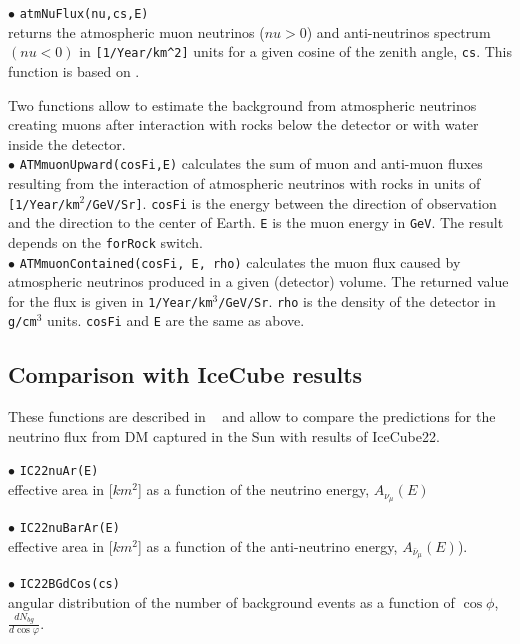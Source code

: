 \documentclass[12pt,a4paper]{article}
\begin{document}
\noindent $\bullet$ \verb|atmNuFlux(nu,cs,E)|\\
returns the atmospheric  muon neutrinos ($nu>0$) and anti-neutrinos spectrum
$(nu<0)$ in \verb|[1/Year/km^2]| units for a given cosine of the zenith angle, \verb|cs|. This function is  based on
\cite{Honda:2006qj}.   


Two functions allow to estimate the background from atmospheric neutrinos creating muons after interaction  with rocks below the detector  or with water inside the detector.\\
\noindent $\bullet$  \verb|ATMmuonUpward(cosFi,E)| calculates the sum of  muon
and anti-muon fluxes resulting from the
interaction of  atmospheric  neutrinos with rocks in units of  
\verb|[1/Year/km|$^2$\verb|/GeV/Sr]|. \verb|cosFi|  is the energy between the direction of
observation and the direction to the center of Earth. \verb|E|  is the  muon energy in
{\tt GeV}. The  result depends on  the {\tt forRock} switch. \\
\noindent $\bullet$  \verb|ATMmuonContained(cosFi, E, rho)| calculates the muon flux
caused by atmospheric  neutrinos  produced in a given (detector)
volume. The returned value for the flux is given in
\verb|1/Year/km|$^3$\verb|/GeV/Sr|. {\tt rho} is
the density of the detector in \verb|g/cm|$^3$ units. {\tt cosFi} and {\tt E} are the
same as above. 

\subsection{Comparison with IceCube results}


These functions are described in ~\cite{Belanger:2015hra} and allow to compare the predictions for the neutrino flux from DM captured in the Sun with results of IceCube22.

\noindent
$\bullet$ \verb|IC22nuAr(E)|\\
effective area in [$km^2$] as a function of the neutrino energy, $A_{\nu_{\mu}}(E)$ 

\noindent$\bullet$ \verb|IC22nuBarAr(E)|\\
effective area in [$km^2$] as a function of the anti-neutrino energy, $A_{\bar{\nu}_{\mu}}(E)$).


\noindent
$\bullet$ \verb|IC22BGdCos(cs)| \\
angular distribution of the number of background events as a function of $\cos\phi$, $\frac{dN_{bg}}{d\cos{\varphi}}$.
  
\end{document}
